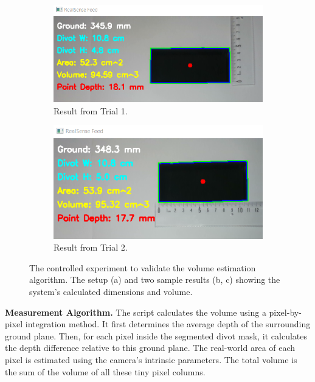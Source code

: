 \begin{figure}[h!]
    \begin{subfigure}[b]{0.49\textwidth}
        \centering
        \includegraphics[width=\linewidth]{figures/volume_test_result_5_fix.png}
        \caption{Result from Trial 1.}
        \label{fig:volume_test_result_1}
    \end{subfigure}
    \hfill
    \begin{subfigure}[b]{0.49\textwidth}
        \centering
        \includegraphics[width=\linewidth]{figures/volume_test_result_11_fix.png}
        \caption{Result from Trial 2.}
        \label{fig:volume_test_result_2}
    \end{subfigure}
    \caption{The controlled experiment to validate the volume estimation algorithm. The setup (a) and two sample results (b, c) showing the system's calculated dimensions and volume.}
    \label{fig:volume_test_setup}
\end{figure}

\textbf{Measurement Algorithm.}
The script calculates the volume using a pixel-by-pixel integration method. It first determines the average depth of the surrounding ground plane. Then, for each pixel inside the segmented divot mask, it calculates the depth difference relative to this ground plane. The real-world area of each pixel is estimated using the camera's intrinsic parameters. The total volume is the sum of the volume of all these tiny pixel columns.


